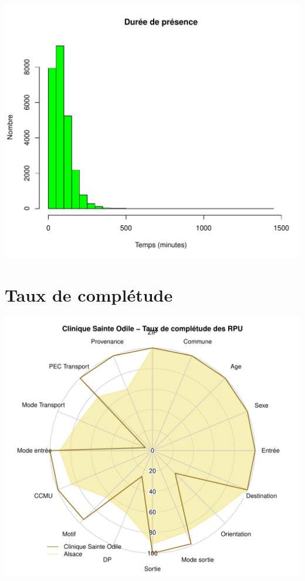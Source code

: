 \documentclass[12pt,english,french,twoside]{book}\usepackage[]{graphicx}\usepackage[]{color}
\makeatletter
\def\maxwidth{ %
  \ifdim\Gin@nat@width>\linewidth
    \linewidth
  \else
    \Gin@nat@width
  \fi
}
\newenvironment{knitrout}{}{} %
\makeatother
\begin{document}
\begin{knitrout}
\color{fgcolor}
\includegraphics[width=\maxwidth]{figure/graphe_odi} 

\end{knitrout}


\section*{Taux de complétude}

\begin{knitrout}
\color{fgcolor}
\includegraphics[width=\maxwidth]{figure/compl_odi} 

\end{knitrout}
\end{document}

